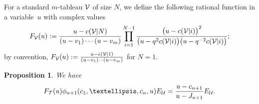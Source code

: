 \documentclass[11pt]{article}
\newtheorem{Proposition}[Theorem]{Proposition}
\begin{document}
For a standard $m$-tableau ${\cal{V}}$ of size $N$, we def\/ine
the following rational function in a variab\-le~$u$ with complex values
\begin{gather}\label{def-F1}
F_{{\cal{V}}}(u):=\frac{u-c({\cal{V}}|N)}{(u-v_1)\cdots(u-v_m)}\prod_{i=1}^{N-1}\frac{\bigl(u-c({\cal{V}}|i)\bigr)^2}
{\bigl(u-q^2c({\cal{V}}|i)\bigr)\bigl(u-q^{-2}c({\cal{V}}|i)\bigr)} ;
\end{gather}
by convention,
$F_{{\cal{V}}}(u):= \frac{u-c({\cal{V}}|1)}{(u-v_1)\cdots(u-v_m)} $
for $N=1$.

\begin{Proposition} \label{prop-idem11}
We have
\begin{gather}\label{eq-idem11}
F_{{\cal{T}}}(u)\phi_{n+1}(c_1,\dots,c_n,u)E_{{\cal{U}}}=\frac{u-c_{n+1}}{u-J_{n+1}}  E_{{\cal{U}}}.
\end{gather}
\end{Proposition}
\end{document}
